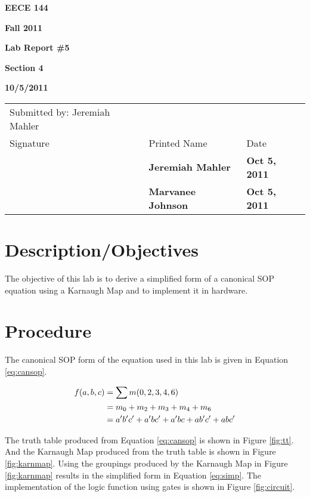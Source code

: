 \documentclass[12pt]{article}
\begin{document}

\centerline{\bf EECE 144}
\centerline{\bf Fall 2011}
\centerline{\bf}
\centerline{\bf Lab Report \#5}
\centerline{\bf Section 4}
\centerline{\bf 10/5/2011}

\begin{center}
\begin{tabularx}{\textwidth}[b]{X l l}
Submitted by: Jeremiah Mahler & & \\
Signature & Printed Name & Date \\
\hline
\multicolumn{1}{|X|}{} & \multicolumn{1}{|l|}{\bigstrut \bf Jeremiah Mahler} & \multicolumn{1}{|l|}{\bf Oct 5, 2011} \\
\hline
\multicolumn{1}{|X|}{} & \multicolumn{1}{|l|}{\bigstrut \bf Marvanee Johnson} & \multicolumn{1}{|l|}{\bf Oct 5, 2011} \\
\hline
\end{tabularx}
\end{center}

\section{Description/Objectives}

The objective of this lab is to derive a simplified form
of a canonical SOP equation using a Karnaugh Map and
to implement it in hardware.

\section{Procedure}
\label{sec:procedure}

The canonical SOP form of the equation used in this lab is
given in Equation \ref{eq:cansop}.

\begin{align}
f(a, b, c) &= \sum m(0, 2, 3, 4, 6) \label{eq:cansop} \\
	    &= m_0 + m_2 + m_3 + m_4 + m_6 \notag \\
		&= a' b' c' + a' b c' + a' b c + a b' c' + a b c' \notag
\end{align}

The truth table produced from Equation \ref{eq:cansop}
is shown in Figure \ref{fig:tt}.
And the Karnaugh Map produced from the truth table
is shown in Figure \ref{fig:karnmap}.
Using the groupings produced by the Karnaugh Map in Figure \ref{fig:karnmap}
results in the simplified form in Equation \ref{eq:simp}.
The implementation of the logic function using gates is
shown in Figure \ref{fig:circuit}.
\end{document}

